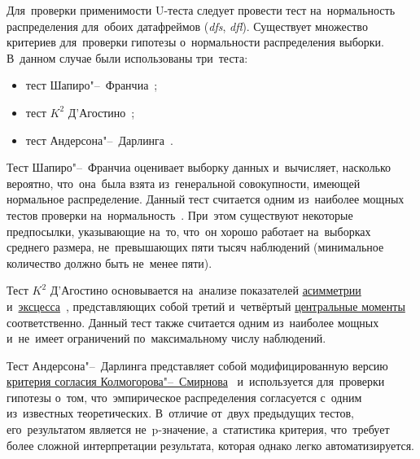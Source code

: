 \documentclass[]{scrreprt}
\begin{document}
Для~проверки применимости U-теста следует провести тест на~нормальность распределения для~обоих датафреймов (\textit{dfs}, \textit{dfl}). Существует множество критериев для~проверки гипотезы о~нормальности распределения выборки. В~данном случае были использованы три~теста:
\begin{itemize}
	\item тест Шапиро"--~Франчиа~\cite{Shapiro-Wilk-test};
	\item тест ${\textstyle K^{2}}$ Д'Агостино~\cite{Agostino-test};
	\item тест Андерсона"--~Дарлинга~\cite{Anderson-Darling-test}.
\end{itemize}
Тест Шапиро"--~Франчиа оценивает выборку данных и~вычисляет, насколько вероятно, что~она~была взята из~генеральной совокупности, имеющей нормальное распределение. Данный тест считается одним из~наиболее мощных тестов проверки на~нормальность~\cite{Kobzarq-prikl-mathstat}. При~этом существуют некоторые предпосылки, указывающие на~то, что~он хорошо работает на~выборках среднего размера, не~превышающих пяти тысяч наблюдений (минимальное количество должно быть не~менее пяти). 

Тест ${\textstyle K^{2}}$ Д'Агостино основывается на~анализе показателей \href{https://en.wikipedia.org/wiki/Skewness}{асимметрии}~\cite{Wiki:skewness} и~\href{https://en.wikipedia.org/wiki/Kurtosis}{эксцесса}~\cite{Wiki:kurtosis}, представляющих собой третий и~четвёртый \href{https://en.wikipedia.org/wiki/Central_moment}{центральные моменты}~\cite{Wiki:central-moment} соответственно. Данный тест также считается одним из~наиболее мощных и~не~имеет ограничений по~максимальному числу наблюдений.

Тест Андерсона"--~Дарлинга представляет собой модифицированную версию \href{Wiki:Kolmogorow-Smirnow-test}{критерия согласия Колмогорова"--~Смирнова}~\cite{Wiki:Kolmogorow-Smirnow-test} и~используется для~проверки гипотезы о~том, что~эмпирическое распределения согласуется с~одним из~известных теоретических. В~отличие от~двух предыдущих тестов, его~результатом является не~p-значение, а~статистика критерия, что~требует более сложной интерпретации результата, которая однако легко автоматизируется.
\end{document}
